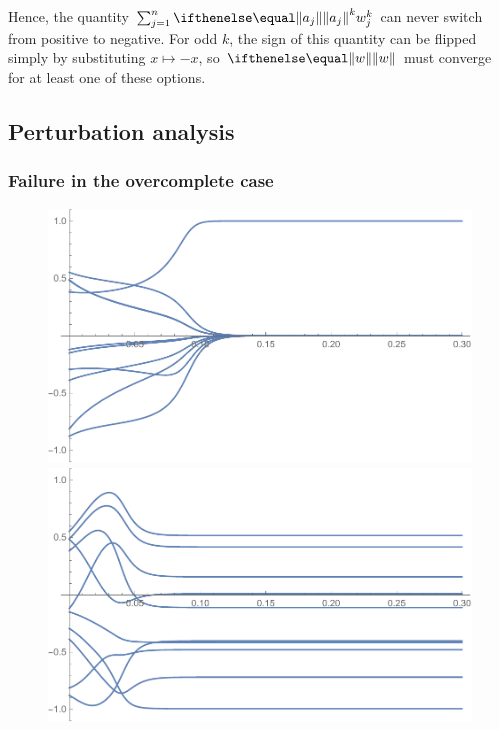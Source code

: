 \documentclass{hw-scrartcl}
\begin{document}
Hence, the quantity \(\sum_{j=1}^n \norm{a_j}^k w_j^k\) can never switch from positive to negative. For odd \(k\), the sign of this quantity can be flipped simply by substituting \(x \mapsto -x\), so \(\norm{w}\) must converge for at least one of these options.

\subsection{Perturbation analysis}

\subsubsection{Failure in the overcomplete case}
\begin{figure}[p]
  \centering
  \includegraphics[width=\linewidth*2/3]{perturbation-analysis-failure/unperturbed.pdf}
  \vfill
  \includegraphics[width=\linewidth*2/3]{perturbation-analysis-failure/perturbed.pdf}
  \vfill

\end{figure}
\end{document}
